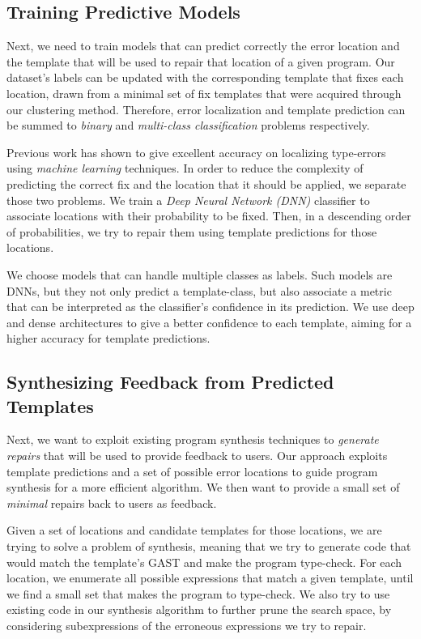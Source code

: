 \subsection{Training Predictive Models}
\label{sec:overview:predict}

Next, we need to train models that can predict correctly the error location and
the template that will be used to repair that location of a given program. Our
dataset's labels can be updated with the corresponding template that fixes each
location, drawn from a minimal set of fix templates that were acquired through
our clustering method. Therefore, error localization and template prediction can
be summed to \emph{binary} and \emph{multi-class classification} problems
respectively.

 Previous work has shown to give excellent accuracy
on localizing type-errors using \emph{machine learning} techniques. In order to
reduce the complexity of predicting the correct fix and the location that it
should be applied, we separate those two problems. We train a \emph{Deep Neural
Network (DNN)} classifier to associate locations with their probability to be
fixed. Then, in a descending order of probabilities, we try to repair them using
template predictions for those locations.

 We choose models that can handle multiple
classes as labels. Such models are DNNs, but they not only predict a
template-class, but also associate a metric that can be interpreted as the
classifier’s confidence in its prediction. We use deep and dense architectures
to give a better confidence to each template, aiming for a higher accuracy for
template predictions.

\subsection{Synthesizing Feedback from Predicted Templates}
\label{sec:overview:synthesis}

Next, we want to exploit existing program synthesis techniques to \emph{generate
repairs} that will be used to provide feedback to users. Our approach exploits
template predictions and a set of possible error locations to guide program
synthesis for a more efficient algorithm. We then want to provide a small set of
\emph{minimal} repairs back to users as feedback.

 Given a set of locations and candidate templates for
those locations, we are trying to solve a problem of synthesis, meaning that we
try to generate code that would match the template’s GAST and make the program
type-check. For each location, we enumerate all possible expressions that match
a given template, until we find a small set that makes the program to
type-check. We also try to use existing code in our synthesis algorithm to
further prune the search space, by considering subexpressions of the erroneous
expressions we try to repair.

